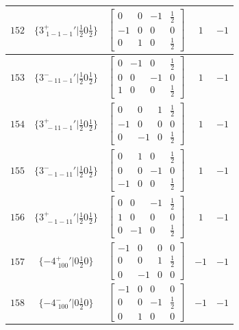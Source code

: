 \documentclass[fleqn,8pt]{jsarticle}
\begin{document}
\begin{longtable}{ccccc}
$ 152 $ & $ \{3^{+}_{\,\,1-1-1}{}'|\frac{1}{2} 0 \frac{1}{2}\} $ & $ \begin{bmatrix} 0 & 0 & -1 & \frac{1}{2} \\ -1 & 0 & 0 & 0 \\ 0 & 1 & 0 & \frac{1}{2} \end{bmatrix} $ & $ 1 $ & $ -1 $ \\ \hline
$ 153 $ & $ \{3^{-}_{\,\,-11-1}{}'|\frac{1}{2} 0 \frac{1}{2}\} $ & $ \begin{bmatrix} 0 & -1 & 0 & \frac{1}{2} \\ 0 & 0 & -1 & 0 \\ 1 & 0 & 0 & \frac{1}{2} \end{bmatrix} $ & $ 1 $ & $ -1 $ \\ \hline
$ 154 $ & $ \{3^{+}_{\,\,-11-1}{}'|\frac{1}{2} 0 \frac{1}{2}\} $ & $ \begin{bmatrix} 0 & 0 & 1 & \frac{1}{2} \\ -1 & 0 & 0 & 0 \\ 0 & -1 & 0 & \frac{1}{2} \end{bmatrix} $ & $ 1 $ & $ -1 $ \\ \hline
$ 155 $ & $ \{3^{-}_{\,\,-1-11}{}'|\frac{1}{2} 0 \frac{1}{2}\} $ & $ \begin{bmatrix} 0 & 1 & 0 & \frac{1}{2} \\ 0 & 0 & -1 & 0 \\ -1 & 0 & 0 & \frac{1}{2} \end{bmatrix} $ & $ 1 $ & $ -1 $ \\ \hline
$ 156 $ & $ \{3^{+}_{\,\,-1-11}{}'|\frac{1}{2} 0 \frac{1}{2}\} $ & $ \begin{bmatrix} 0 & 0 & -1 & \frac{1}{2} \\ 1 & 0 & 0 & 0 \\ 0 & -1 & 0 & \frac{1}{2} \end{bmatrix} $ & $ 1 $ & $ -1 $ \\ \hline
$ 157 $ & $ \{-4^{+}_{\,\,100}{}'|0 \frac{1}{2} 0\} $ & $ \begin{bmatrix} -1 & 0 & 0 & 0 \\ 0 & 0 & 1 & \frac{1}{2} \\ 0 & -1 & 0 & 0 \end{bmatrix} $ & $ -1 $ & $ -1 $ \\ \hline
$ 158 $ & $ \{-4^{-}_{\,\,100}{}'|0 \frac{1}{2} 0\} $ & $ \begin{bmatrix} -1 & 0 & 0 & 0 \\ 0 & 0 & -1 & \frac{1}{2} \\ 0 & 1 & 0 & 0 \end{bmatrix} $ & $ -1 $ & $ -1 $ \\ \hline

\end{longtable}
\end{document}
